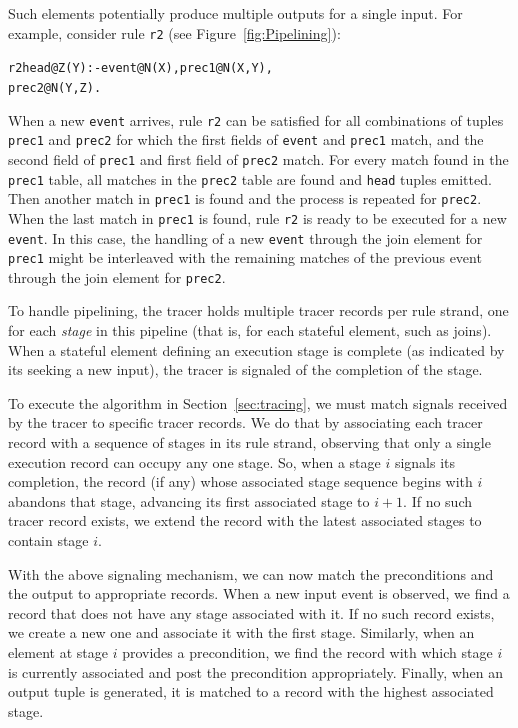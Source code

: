 \documentclass{sig-alt-full}
\newenvironment{overlog}{\begin{alltt}\footnotesize}{\end{alltt}}
\newcommand{\ol}[1]{{\tt\footnotesize#1}}
\begin{document}
Such elements potentially produce multiple outputs for a single input.
For example, consider  rule \ol{r2} (see Figure~\ref{fig:Pipelining}):
\begin{overlog}
r2 head@Z(Y) :- event@N(X), prec1@N(X, Y),
   prec2@N(Y, Z).
\end{overlog}
When a new \ol{event} arrives, rule \ol{r2} can
be satisfied for all combinations of tuples
\ol{prec1} and \ol{prec2} for which the first
fields of \ol{event} and \ol{prec1} match, and
the second field of \ol{prec1} and first field of
\ol{prec2} match.  For every match found in the
\ol{prec1} table, all matches in the \ol{prec2}
table are found and \ol{head} tuples emitted.
Then another match in \ol{prec1} is found and the
process is repeated for \ol{prec2}.  When the
last match in \ol{prec1} is found, rule \ol{r2}
is ready to be executed for a new \ol{event}.  In
this case, the handling of a new \ol{event}
through the join element for \ol{prec1} might
be interleaved with the remaining matches of the
previous event through the join element for
\ol{prec2}.

To handle pipelining, the tracer holds multiple
tracer records per rule strand, one for each
\emph{stage} in this pipeline (that is, for each
stateful element, such as joins).  When a
stateful element defining an execution stage is
complete (as indicated by its seeking a new
input), the tracer is signaled of the completion
of the stage.

To execute the algorithm in
Section~\ref{sec:tracing}, we must match
signals received by the tracer to specific
tracer records.  We do that by associating
each tracer record with a sequence of stages
in its rule strand, observing that only a single
execution record can occupy any one stage.
So, when a stage $i$ signals its completion, the
record (if any) whose associated stage sequence
begins with $i$ abandons that stage, advancing
its first associated stage to $i+1$. If no such
tracer record exists, we extend the record with
the latest associated stages to contain stage
$i$.  

With the above signaling mechanism, we can now
match the preconditions and the output to appropriate
records. When a new input event is observed, we 
find a record that does not have any stage 
associated with it. If no such record exists, we
create a new one and associate it with the first stage.
Similarly, when an element at stage $i$ 
provides a precondition, we find the record with
which stage $i$ is currently associated and post
the precondition appropriately. Finally, when
an output tuple is generated, it is matched to
a record with the highest associated stage.
\end{document}
